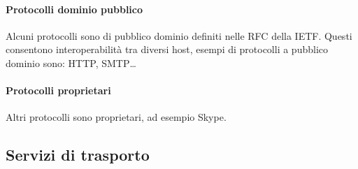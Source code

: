             \paragraph{Protocolli dominio pubblico}Alcuni protocolli sono di pubblico dominio definiti nelle \acrfull*{RFC} della \acrfull*{IETF}. Questi consentono interoperabilità tra diversi host, esempi di protocolli a pubblico dominio sono: \Acrshort*{HTTP}, \Acrshort*{SMTP}\dots
            \paragraph{Protocolli proprietari} Altri protocolli sono proprietari, ad esempio Skype.
    \subsection{Servizi di trasporto}
